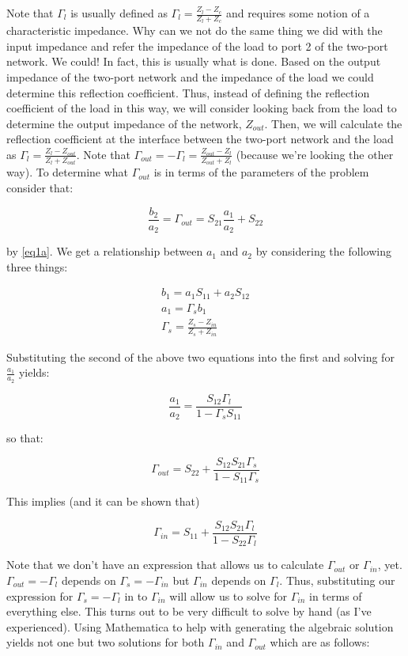Note that $\Gamma_l$ is usually defined as $\Gamma_l = \frac{Z_l - Z_c}{Z_l +
Z_c}$ and requires some notion of a
characteristic impedance. Why can we not do the same thing we did with the input
impedance and refer the impedance of the load to port 2 of the two-port
network. We could! In fact, this is usually what is done. Based on the output
impedance of the two-port network and the impedance of the load we could
determine this reflection coefficient. Thus, instead of defining the reflection
coefficient of the load in this way, we will consider looking back from the load
to determine the output impedance of the network, $Z_{out}$. Then, we will
calculate the reflection coefficient at the interface between the two-port
network and the load as $\Gamma_l = \frac{Z_l - Z_{out}}{Z_l + Z_{out}}$. Note that
$\Gamma_{out} = -\Gamma_l = \frac{Z_{out} - Z_l}{Z_{out} + Z_l}$ (because we're
looking the other way). To determine what $\Gamma_{out}$ is in terms of the
parameters of the problem consider that:

\[ 
        \frac{b_2}{a_2} = \Gamma_{out} = S_{21}\frac{a_1}{a_2} + S_{22}
\]

by \ref{eq1a}. We get a relationship between $a_1$ and $a_2$ by considering the
following three things:

\begin{align*}
    b_1 = a_1 S_{11} + a_2 S_{12} \\
    a_1 = \Gamma_s b_1 \\
    \Gamma_s = \frac{Z_s-Z_{in}}{Z_s+Z_{in}}
\end{align*}

Substituting the second of the above two equations into the first and solving
for $\frac{a_1}{a_2}$ yields:

\[ 
        \frac{a_1}{a_2} = \frac{S_{12} \Gamma_l}{1-\Gamma_s S_{11}} 
\]

so that:

\[ 
        \Gamma_{out} = S_{22} + \frac{S_{12}S_{21} \Gamma_s}{1-S_{11}\Gamma_s} 
\]

This implies (and it can be shown that)

\[ 
        \Gamma_{in} = S_{11} + \frac{S_{12}S_{21} \Gamma_l}{1-S_{22}\Gamma_l} 
\]

Note that we don't have an expression that allows us to calculate $\Gamma_{out}$
or $\Gamma_{in}$, yet. $\Gamma_{out} = -\Gamma_l$ depends on $\Gamma_s = -\Gamma_{in}$ but
$\Gamma_{in}$ depends on $\Gamma_l$. Thus, substituting our expression for
$\Gamma_s = -\Gamma_l$ in to $\Gamma_{in}$ will allow us to solve for
$\Gamma_{in}$ in terms of everything else. This turns out to be very difficult
to solve by hand (as I've experienced). Using Mathematica to help with
generating the algebraic solution yields not one but two solutions for both
$\Gamma_{in}$ and $\Gamma_{out}$ which are as follows:

